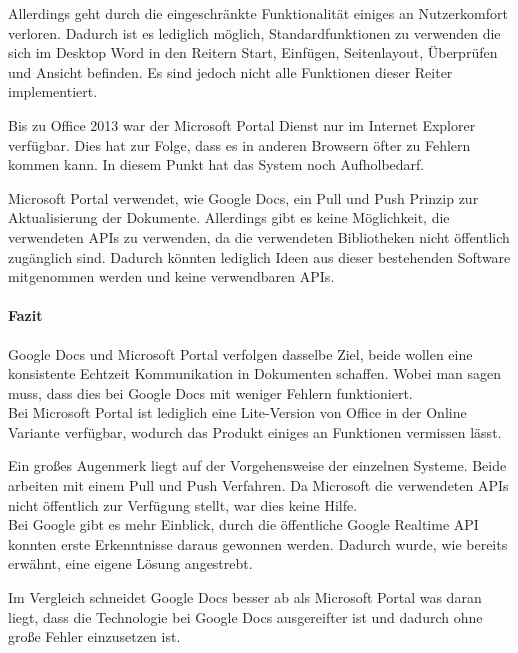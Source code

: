 Allerdings geht durch die eingeschränkte Funktionalität einiges an Nutzerkomfort verloren. Dadurch ist es lediglich möglich, Standardfunktionen zu verwenden die sich im Desktop Word in den Reitern Start, Einfügen, Seitenlayout, Überprüfen und Ansicht befinden. Es sind jedoch nicht alle Funktionen dieser Reiter implementiert.

Bis zu Office 2013 war der Microsoft Portal Dienst nur im Internet Explorer verfügbar. Dies hat zur Folge, dass es in anderen Browsern öfter zu Fehlern kommen kann. In diesem Punkt hat das System noch Aufholbedarf.

Microsoft Portal verwendet, wie Google Docs, ein Pull und Push Prinzip zur Aktualisierung der Dokumente. Allerdings gibt es keine Möglichkeit, die verwendeten APIs zu verwenden, da die verwendeten Bibliotheken nicht öffentlich zugänglich sind. Dadurch könnten lediglich Ideen aus dieser bestehenden Software mitgenommen werden und keine verwendbaren APIs.

\paragraph{Fazit}
Google Docs und Microsoft Portal verfolgen dasselbe Ziel, beide wollen eine konsistente Echtzeit Kommunikation in Dokumenten schaffen. Wobei man sagen muss, dass dies bei Google Docs mit weniger Fehlern funktioniert.\\
Bei Microsoft Portal ist lediglich eine Lite-Version von Office in der Online Variante verfügbar, wodurch das Produkt einiges an Funktionen vermissen lässt.

Ein großes Augenmerk liegt auf der Vorgehensweise der einzelnen Systeme. Beide arbeiten mit einem Pull und Push Verfahren. Da Microsoft die verwendeten APIs nicht öffentlich zur Verfügung stellt, war dies keine Hilfe.\\
Bei Google gibt es mehr Einblick, durch die öffentliche Google Realtime API konnten erste Erkenntnisse daraus gewonnen werden. Dadurch wurde, wie bereits erwähnt, eine eigene Lösung angestrebt.

Im Vergleich schneidet Google Docs besser ab als Microsoft Portal was daran liegt, dass die Technologie bei Google Docs ausgereifter ist und dadurch ohne große Fehler einzusetzen ist.